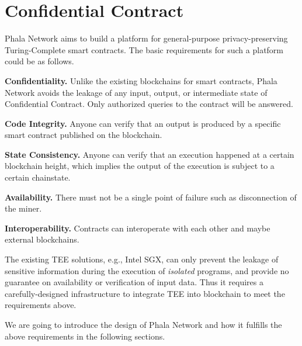 \section{Confidential Contract}

Phala Network aims to build a platform for general-purpose privacy-preserving Turing-Complete smart contracts. The basic requirements for such a platform could be as follows.

\begin{icompact}
    \item \textbf{Confidentiality.}
    Unlike the existing blockchains for smart contracts, Phala Network avoids the leakage of any input, output, or intermediate state of Confidential Contract. Only authorized queries to the contract will be answered.

    \item \textbf{Code Integrity.}
    Anyone can verify that an output is produced by a specific smart contract published on the blockchain.

    \item \textbf{State Consistency.}
    Anyone can verify that an execution happened at a certain blockchain height, which implies the output of the execution is subject to a certain chainstate.

    \item \textbf{Availability.}
    There must not be a single point of failure such as disconnection of the miner.

    \item \textbf{Interoperability.}
    Contracts can interoperate with each other and maybe external blockchains.
\end{icompact}

The existing TEE solutions, e.g., Intel SGX, can only prevent the leakage of sensitive information during the execution of \textit{isolated} programs, and provide no guarantee on availability or verification of input data. Thus it requires a carefully-designed infrastructure to integrate TEE into blockchain to meet the requirements above.

We are going to introduce the design of Phala Network and how it fulfills the above requirements in the following sections.

